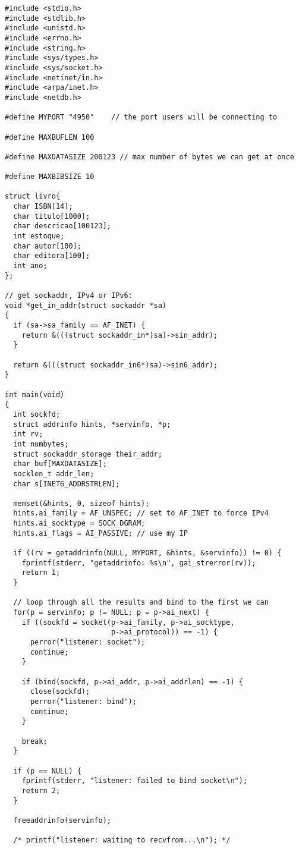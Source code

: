 \documentclass[11pt, brazil]{article} %
\begin{document}
\begin{verbatim}
#include <stdio.h>
#include <stdlib.h>
#include <unistd.h>
#include <errno.h>
#include <string.h>
#include <sys/types.h>
#include <sys/socket.h>
#include <netinet/in.h>
#include <arpa/inet.h>
#include <netdb.h>

#define MYPORT "4950"    // the port users will be connecting to

#define MAXBUFLEN 100

#define MAXDATASIZE 200123 // max number of bytes we can get at once

#define MAXBIBSIZE 10

struct livro{
  char ISBN[14];
  char titulo[1000];
  char descricao[100123];
  int estoque;
  char autor[100];
  char editora[100];
  int ano;
};

// get sockaddr, IPv4 or IPv6:
void *get_in_addr(struct sockaddr *sa)
{
  if (sa->sa_family == AF_INET) {
    return &(((struct sockaddr_in*)sa)->sin_addr);
  }

  return &(((struct sockaddr_in6*)sa)->sin6_addr);
}

int main(void)
{
  int sockfd;
  struct addrinfo hints, *servinfo, *p;
  int rv;
  int numbytes;
  struct sockaddr_storage their_addr;
  char buf[MAXDATASIZE];
  socklen_t addr_len;
  char s[INET6_ADDRSTRLEN];

  memset(&hints, 0, sizeof hints);
  hints.ai_family = AF_UNSPEC; // set to AF_INET to force IPv4
  hints.ai_socktype = SOCK_DGRAM;
  hints.ai_flags = AI_PASSIVE; // use my IP

  if ((rv = getaddrinfo(NULL, MYPORT, &hints, &servinfo)) != 0) {
    fprintf(stderr, "getaddrinfo: %s\n", gai_strerror(rv));
    return 1;
  }

  // loop through all the results and bind to the first we can
  for(p = servinfo; p != NULL; p = p->ai_next) {
    if ((sockfd = socket(p->ai_family, p->ai_socktype,
                         p->ai_protocol)) == -1) {
      perror("listener: socket");
      continue;
    }

    if (bind(sockfd, p->ai_addr, p->ai_addrlen) == -1) {
      close(sockfd);
      perror("listener: bind");
      continue;
    }

    break;
  }

  if (p == NULL) {
    fprintf(stderr, "listener: failed to bind socket\n");
    return 2;
  }

  freeaddrinfo(servinfo);

  /* printf("listener: waiting to recvfrom...\n"); */
    

\end{verbatim}
\end{document}
